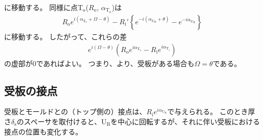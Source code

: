 に移動する。
同様に点T$_\mathrm o$($R_\mathrm o$, $\alpha_{\mathrm T_\mathrm o}$)は
\begin{align*}
  R_\mathrm oe^{i(\alpha_{\mathrm T_\mathrm o}+\Omega-\theta)}
  -R_\mathrm i'\!
   \left\{e^{-i(\alpha_{\mathrm U_\mathrm B} + \theta)} - e^{-i\alpha_{\mathrm U_\mathrm B}}\right\}
\end{align*}
に移動する。
したがって、これらの差
\begin{align*}
  e^{i(\Omega-\theta)}\!
  \left(R_\mathrm oe^{i\alpha_{\mathrm T_\mathrm o}} - R_\mathrm ie^{i\alpha_{\mathrm T_\mathrm i}}\right)
\end{align*}
の虚部が$0$であればよい。
つまり、より、受板がある場合も$\Omega = \theta$である。



\subsection{受板の接点}
受板とモールドとの（トップ側の）接点は、$R_\mathrm ie^{i\alpha_{\mathrm U_\mathrm B}}$で与えられる。
このとき厚さ$\delta_\mathrm s$のスペーサを取付けると、U$_\mathrm B$を中心に回転するが、それに伴い受板における接点の位置も変化する。


